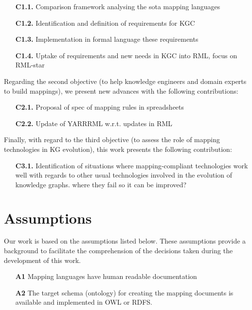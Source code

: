 \begin{enumerate}
    \item[\textbf{C1.1.}] Comparison framework analysing the sota mapping languages
    \item[\textbf{C1.2.}] Identification and definition of requirements for KGC 
    \item[\textbf{C1.3.}] Implementation in formal language these requirements
    \item[\textbf{C1.4.}] Uptake of requirements and new needs in KGC into RML, focus on RML-star
\end{enumerate}

Regarding the second objective (to help knowledge engineers and domain experts to build mappings), we present new advances with the following contributions:

\begin{enumerate}
    \item[\textbf{C2.1.}] Proposal of spec of mapping rules in spreadsheets
    \item[\textbf{C2.2.}] Update of YARRRML w.r.t. updates in RML 
\end{enumerate}

Finally, with regard to the third objective (to assess the role of mapping technologies in KG evolution), this work presents the following contribution:

\begin{enumerate}
    \item[\textbf{C3.1.}] Identification of situations where mapping-compliant technologies work well with regards to other usual technologies involved in the evolution of knowledge graphs.  where they fail so it can be improved?
\end{enumerate}


\section{Assumptions}
\label{sec:chp3-assumptions}
Our work is based on the assumptions listed below. These assumptions provide a background to facilitate the comprehension of the decisions taken during the development of this work. 


\begin{enumerate}
    \item[\textbf{A1}] Mapping languages have human readable documentation
    \item[\textbf{A2}] The target schema (ontology) for creating the mapping documents is available and implemented in OWL or RDFS. 
\end{enumerate}


